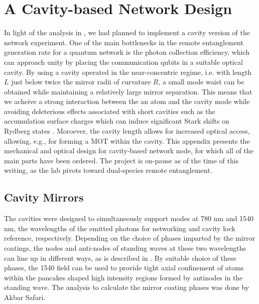 \chapter{A Cavity-based Network Design}\label{ch:cavitynode}

In light of the analysis in \cite{Young2022}, we had planned to implement a cavity version of the network experiment. One of the main bottlenecks in the remote entanglement generation rate for a quantum network is the photon collection efficiency, which can approach unity by placing the communication qubits in a suitable optical cavity. By using a cavity operated in the near-concentric regime, i.e. with length $L$ just below twice the mirror radii of curvature $R$, a small mode waist can be obtained while maintaining a relatively large mirror separation. This means that we acheive a strong interaction between the an atom and the cavity mode while avoiding deleterious effects associated with short cavities such as the accumulation surface charges which can induce significant Stark shifts on Rydberg states \cite{Bohorquez2023}. Moroever, the cavity length allows for increased optical access, allowing, e.g., for forming a MOT within the cavity. This appendix presents the mechanical and optical design for cavity-based network node, for which all of the main parts have been ordered. The project is on-pause as of the time of this writing, as the lab pivots toward dual-species remote entanglement.

\section{Cavity Mirrors}\label{sec:cavmirrors}

The cavities were designed to simultaneously support modes at 780 nm and 1540 nm, the wavelengths of the emitted photons for networking and cavity lock reference, respectively. Depending on the choice of phases imparted by the mirror coatings, the nodes and anti-nodes of standing waves at these two wavelengths can line up in different ways, as is described in \cite{garcia2020overlapping}. By suitable choice of these phases, the 1540 field can be used to provide tight axial confinement of atoms within the pancakes shaped high intensity regions formed by antinodes in the standing wave. The analysis to calculate the mirror coating phases was done by Akbar Safari.

